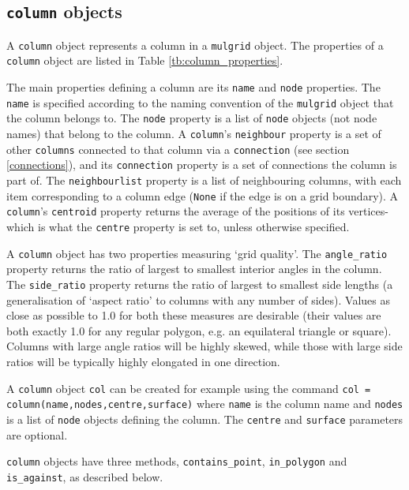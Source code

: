 \subsection{\texttt{column} objects}
\label{columnobjects}

A \texttt{column} object represents a column in a \texttt{mulgrid} object.  The properties of a \texttt{column} object are listed in Table \ref{tb:column_properties}.

The main properties defining a column are its \texttt{name} and \texttt{node} properties.  The \texttt{name} is specified according to the naming convention of the \texttt{mulgrid} object that the column belongs to.  The \texttt{node} property is a list of \texttt{node} objects (not node names) that belong to the column.  A \texttt{column}'s \texttt{neighbour} property is a set of other \texttt{columns} connected to that column via a \texttt{connection} (see section \ref{connections}), and its \texttt{connection} property is a set of connections the column is part of.  The \texttt{neighbourlist} property is a list of neighbouring columns, with each item corresponding to a column edge (\texttt{None} if the edge is on a grid boundary).  A \texttt{column}'s \texttt{centroid} property returns the average of the positions of its vertices- which is what the \texttt{centre} property is set to, unless otherwise specified.

A \texttt{column} object has two properties measuring `grid quality'.  The \texttt{angle\_ratio} property returns the ratio of largest to smallest interior angles in the column.  The \texttt{side\_ratio} property returns the ratio of largest to smallest side lengths (a generalisation of `aspect ratio' to columns with any number of sides).  Values as close as possible to 1.0 for both these measures are desirable (their values are both exactly 1.0 for any regular polygon, e.g. an equilateral triangle or square).  Columns with large angle ratios will be highly skewed, while those with large side ratios will be typically highly elongated in one direction.

A \texttt{column} object \texttt{col} can be created for example using the command \texttt{col = column(name,nodes,centre,surface)} where \texttt{name} is the column name and \texttt{nodes} is a list of \texttt{node} objects defining the column.  The \texttt{centre} and \texttt{surface} parameters are optional.

\texttt{column} objects have three methods, \texttt{contains\_point}, \texttt{in\_polygon} and \texttt{is\_against}, as described below.

